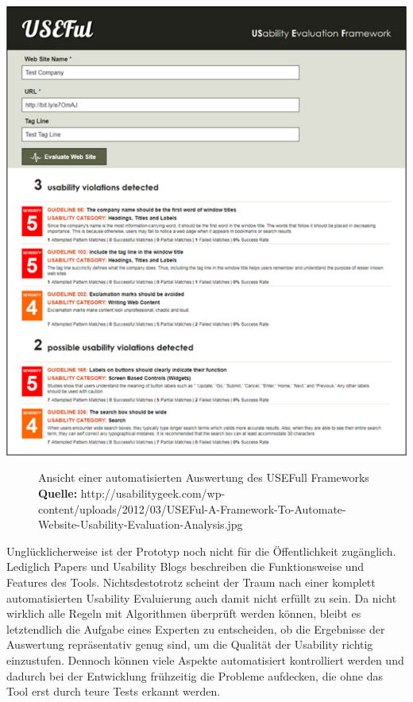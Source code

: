 \vspace{0.3cm}
\begin{center}
\includegraphics[scale=1]{./images/usefull}
\end{center}
\begin{figure}[htb]
   \centering
   \caption{Ansicht einer automatisierten Auswertung des USEFull Frameworks\\\textbf{Quelle:} http://usabilitygeek.com/wp-content/uploads/2012/03/USEFul-A-Framework-To-Automate-Website-Usability-Evaluation-Analysis.jpg}
    \label{usefull}
\end{figure}

Unglücklicherweise ist der Prototyp noch nicht für die Öffentlichkeit zugänglich. Lediglich Papers und Usability Blogs beschreiben die Funktionsweise und Features des Tools. Nichtsdestotrotz scheint der Traum nach einer komplett automatisierten Usability Evaluierung auch damit nicht erfüllt zu sein. Da nicht wirklich alle Regeln mit Algorithmen überprüft werden können, bleibt es letztendlich die Aufgabe eines Experten zu entscheiden, ob die Ergebnisse der Auswertung repräsentativ genug sind, um die Qualität der Usability richtig einzustufen. Dennoch können viele Aspekte automatisiert kontrolliert werden und dadurch bei der Entwicklung frühzeitig die Probleme aufdecken, die ohne das Tool erst durch teure Tests erkannt werden.












